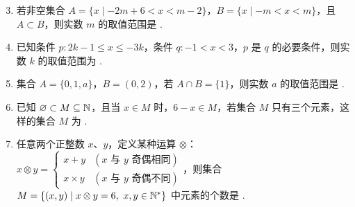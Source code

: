 \documentclass[a4paper,11pt]{article}
\begin{document}


\begin{enumerate}
\setcounter{enumi}{2}

\item 若非空集合 $A=\{x\mid -2m+6<x<m-2\}$，$B=\{x\mid -m<x<m\}$，且 $A\subset B$，则实数 $m$ 的取值范围是 \blankline[4.4em].

\ans{$\left(\dfrac83,6\right]$}

\item 已知条件 $p:2k-1\leqslant x\leqslant -3k$，条件 $q:-1<x<3$，$p$ 是 $q$ 的必要条件，则实数 $k$ 的取值范围为 \blankline[4.4em].

\ans{$(-\infty,-1]$}

\ifanswer
\solbegin
{}
\step{即实数 $k$ 的取值范围是 $(-\infty,-1]$.}
\solend

\fi

\item 集合 $A=\{0,1,a\}$，$B=(0,2)$，若 $A\cap B=\{1\}$，则实数 $a$ 的取值范围是 \blankline[4.4em].

\ans{$(-\infty,0]\cup[2,+\infty)$}

\item 已知 $\varnothing\subset M\subseteq\mathbb{N}$，且当 $x\in M$ 时，$6-x\in M$，若集合 $M$ 只有三个元素，这样的集合 $M$ 为 \blankline[4.4em].


\item 任意两个正整数 $x$、$y$，定义某种运算 $\otimes$：$x\otimes y=\begin{cases}x+y & (x\text{ 与 }y\text{ 奇偶相同})\\ x\times y & (x\text{ 与 }y\text{ 奇偶不同})\end{cases}$，则集合 $M=\{(x,y)\mid x\otimes y=6,\ x,y\in\N^*\}$ 中元素的个数是 \blankline[2.4em].


\end{enumerate}
\end{document}
